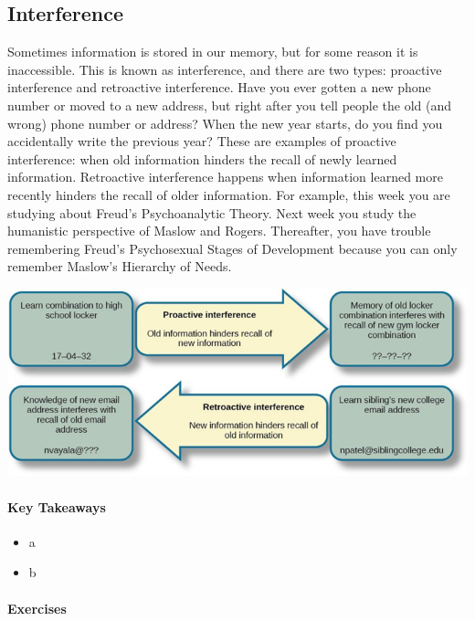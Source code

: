 \documentclass[
]{krantz}
\providecommand{\tightlist}{%
  \setlength{\itemsep}{0pt}\setlength{\parskip}{0pt}}
\begin{document}
\hypertarget{interference}{%
\subsection*{Interference}\label{interference}}


Sometimes information is stored in our memory, but for some reason it is inaccessible. This is known as interference, and there are two types: proactive interference and retroactive interference. Have you ever gotten a new phone number or moved to a new address, but right after you tell people the old (and wrong) phone number or address? When the new year starts, do you find you accidentally write the previous year? These are examples of proactive interference: when old information hinders the recall of newly learned information. Retroactive interference happens when information learned more recently hinders the recall of older information. For example, this week you are studying about Freud's Psychoanalytic Theory. Next week you study the humanistic perspective of Maslow and Rogers. Thereafter, you have trouble remembering Freud's Psychosexual Stages of Development because you can only remember Maslow's Hierarchy of Needs.

\begin{center}\includegraphics[width=0.9\linewidth]{images/ch6/fig4} \end{center}

\hypertarget{key-takeaways-5}{%
\paragraph*{Key Takeaways}\label{key-takeaways-5}}

\begin{itemize}
\tightlist
\item
  a
\item
  b
\end{itemize}

\hypertarget{exercises-5}{%
\paragraph*{Exercises}\label{exercises-5}}
\end{document}

